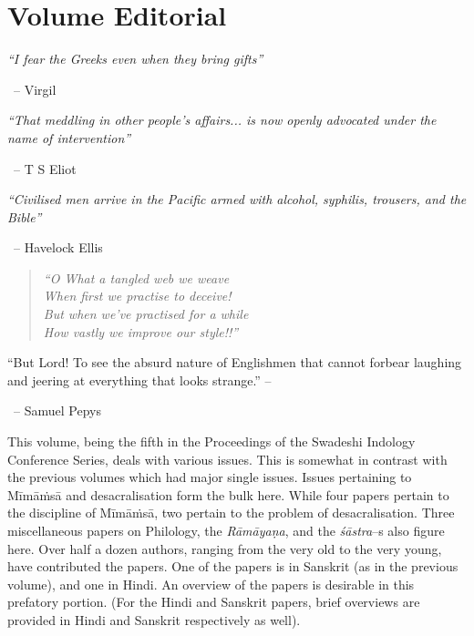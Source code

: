 
\chapter*{Volume Editorial}

\begin{myquote}
\textit{“I fear the Greeks even when they bring gifts”}
\end{myquote}


~\hfill – Virgil

\begin{myquote}
\textit{“That meddling in other people’s affairs... is now openly advocated under the name of intervention”}
\end{myquote}


~\hfill – T S Eliot

\begin{myquote}
\textit{“Civilised men arrive in the Pacific armed with alcohol, syphilis, trousers, and the Bible”}
\end{myquote}


~\hfill – Havelock Ellis

\begin{verse}
\textit{“O What a tangled web we weave\\ When first we practise to deceive!\\ But when we’ve practised for a while\\ How vastly we improve our style!!”}
\end{verse}


\begin{myquote}
“But Lord! To see the absurd nature of Englishmen that cannot forbear laughing and jeering at everything that looks strange.” –
\end{myquote}


~\hfill – Samuel Pepys

This volume, being the fifth in the Proceedings of the Swadeshi Indology Conference Series, deals with various issues. This is somewhat in contrast with the previous volumes which had major single issues. Issues pertaining to Mīmāṁsā and desacralisation form the bulk here. While four papers pertain to the discipline of Mīmāṁsā, two pertain to the problem of desacralisation. Three miscellaneous papers on Philology, the \textit{Rāmāyaṇa}, and the \textit{śāstra}–s also figure here. Over half a dozen authors, ranging from the very old to the very young, have contributed the papers. One of the papers is in Sanskrit (as in the previous volume), and one in Hindi. An overview of the papers is desirable in this prefatory portion. (For the Hindi and Sanskrit papers, brief overviews are provided in Hindi and Sanskrit respectively as well).

